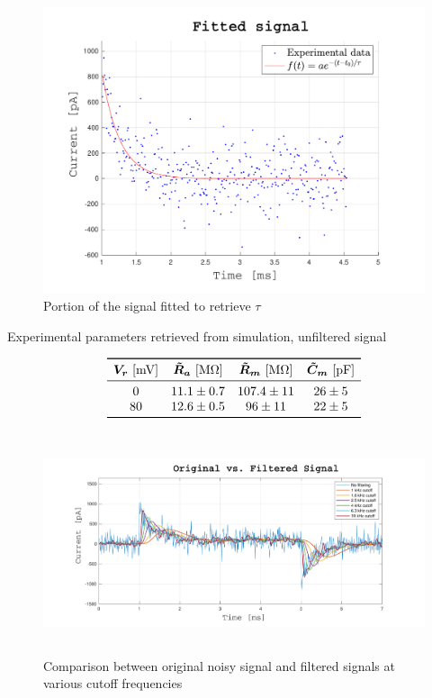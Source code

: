 \documentclass[a4paper]{article}
\begin{document}
\begin{figure}
\centering
\includegraphics[width=.49\textwidth]{Current_fitted.pdf}
\caption{Portion of the signal fitted to retrieve $\tau$}
\label{fig:current_fitted}
\end{figure}


\begin{table}[h]
\caption{Experimental parameters retrieved from simulation, unfiltered signal}
\label{tab:parameters_nofilter}
\vspace{-.4cm}
\centering
\[
\begin{array}{cccc}
\toprule
\bm{V_r}\ [\si{\mV}]&\bm{\tilde{R}_a}\ [\si{\mega \ohm}]&\bm{\tilde{R}_m}\ [\si{\mega\ohm}]& \bm{\tilde{C}_m}\ [\si{\pico\farad}]\\
\midrule
0&11.1\pm 0.7& 107.4 \pm 11 & 26\pm 5\\
80 & 12.6\pm 0.5 & 96\pm11 & 22\pm 5\\ 
\bottomrule
\end{array}
\]
\end{table}

\begin{figure}
\centering
\includegraphics[height=6.5cm]{Bess_all_freq.pdf}
\caption{Comparison between original noisy signal and filtered signals at various cutoff frequencies}
\label{fig:Bess_all_freq}
\end{figure}
\end{document}
